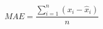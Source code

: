 \begin{equation}
MAE = \frac{\sum _{i=1}^{n} (x_{i}-\widehat{x}_{i})}{n}
\label{eq:meanAbsoluteError}
\end{equation}